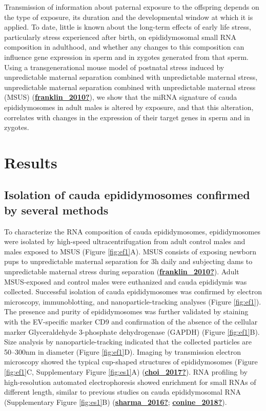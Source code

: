 \documentclass[12pt,twoside]{reedthesis}
\begin{document}
Transmission of information about paternal exposure to the offspring
depends on the type of exposure, its duration and the developmental
window at which it is applied. To date, little is known about the
long-term effects of early life stress, particularly stress experienced
after birth, on epididymosomal small RNA composition in adulthood, and
whether any changes to this composition can influence gene expression in
sperm and in zygotes generated from that sperm. Using a
transgenerational mouse model of postnatal stress induced by
unpredictable maternal separation combined with unpredictable maternal
stress, unpredictable maternal separation combined with unpredictable
maternal stress (MSUS) (\protect\hyperlink{ref-franklin_2010}{\textbf{franklin\_2010?}}), we show that the miRNA
signature of cauda epididymosomes in adult males is altered by exposure,
and that this alteration, correlates with changes in the expression of
their target genes in sperm and in zygotes.

\hypertarget{results-1}{%
\section{Results}\label{results-1}}

\hypertarget{isolation-of-cauda-epididymosomes-confirmed-by-several-methods}{%
\subsection{Isolation of cauda epididymosomes confirmed by several methods}\label{isolation-of-cauda-epididymosomes-confirmed-by-several-methods}}

To characterize the RNA composition of cauda epididymosomes,
epididymosomes were isolated by high-speed ultracentrifugation from
adult control males and males exposed to MSUS (Figure \ref{fig:ef1}A). MSUS
consists of exposing newborn pups to unpredictable maternal separation
for 3h daily and subjecting dams to unpredictable maternal stress during
separation (\protect\hyperlink{ref-franklin_2010}{\textbf{franklin\_2010?}}). Adult MSUS-exposed and control males were
euthanized and cauda epididymis was collected. Successful isolation of
cauda epididymosomes was confirmed by electron microscopy,
immunoblotting, and nanoparticle-tracking analyses (Figure \ref{fig:ef1}). The
presence and purity of epididymosomes was further validated by staining
with the EV-specific marker CD9 and confirmation of the absence of the
cellular marker Glyceraldehyde 3-phosphate dehydrogenase (GAPDH)
(Figure \ref{fig:ef1}B). Size analysis by nanoparticle-tracking indicated that the
collected particles are 50--300nm in diameter (Figure \ref{fig:ef1}D). Imaging by
transmission electron microscopy showed the typical cup-shaped
structures of epididymosomes (Figure \ref{fig:ef1}C, Supplementary Figure \ref{fig:es1}A)
(\protect\hyperlink{ref-choi_2017}{\textbf{choi\_2017?}}). RNA profiling by high-resolution automated electrophoresis
showed enrichment for small RNAs of different length, similar to
previous studies on cauda epididymosomal RNA (Supplementary Figure \ref{fig:es1}B) (\protect\hyperlink{ref-sharma_2016}{\textbf{sharma\_2016?}}; \protect\hyperlink{ref-conine_2018}{\textbf{conine\_2018?}}).
\end{document}
